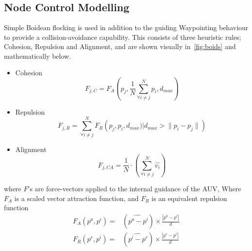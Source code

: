 \documentclass[conference]{IEEEtran}
\begin{document}
\subsection{Node Control Modelling}

Simple Boidean flocking \cite{Reynolds1987a} is used in addition to the guiding Waypointing behaviour to provide a collision-avoidance capability.
This consists of three heuristic rules; Cohesion, Repulsion and Alignment, and are shown visually in~\ref{fig:boids} and mathematically below.
\begin{itemize}
  \item Cohesion
    \begin{equation}
      F_{j,C}= F_A\left(p_j, \frac{1}{N}\sum\limits_{\forall i \ne j}^N{p_i}, d_{max}\right)
    \end{equation}
  \item Repulsion
    \begin{equation}
      F_{j,R}= \sum\limits_{\forall i \ne j}^N F_R\left(p_j, p_i, d_{max}) \big| d_{max}>\|p_i-p_j\|\right)
    \end{equation}
  \item Alignment
    \begin{equation}
      F_{j,CA}= \frac{1}{N}\cdot\left(\sum\limits_{\forall i \ne j}^N \hat{v_i}\right) 
    \end{equation}
\end{itemize}
where $F$'s are force-vectors applied to the internal guidance of the AUV, 
Where $F_A$ is a scaled vector attraction function, and $F_R$ is an equivalent repulsion function
\begin{align}
  F_A(p^a, p^i)=&(\widehat{p^a-p^i}) \times \frac{|p^a-p^i|}{d}\\
  F_R(p^r, p^i)=&(\widehat{p^i-p^r}) \times \frac{|p^r-p^i|}{d}
\end{align}
\end{document}
